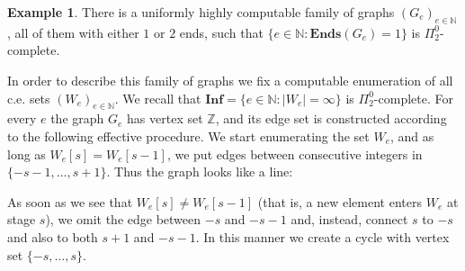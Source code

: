 \documentclass[10pt,A4]{amsart}
\theoremstyle{definition}
\newtheorem{ex}[thm]{Example}
\theoremstyle{definition}
\newcommand{\N}{\mathbb{N}}
\newcommand{\Z}{\mathbb{Z}}
\newcommand{\Ends}[1]{\mathbf{Ends}({#1})}
\begin{document}
\begin{ex}\label{grafo-con-ciclos}
There is a uniformly highly computable family of graphs $(G_e)_{e\in\N}$, all of them with either $1$ or $2$ ends, such that $\{e\in\N : \Ends{G_e}=1\}$ is $\Pi_2^0$-complete. 

In order to describe this family of graphs we fix a computable enumeration of all c.e. sets $(W_e)_{e \in \N}$. We recall that  $\textbf{Inf}=\{e\in\N:|W_e|=\infty\}$ is $\Pi_2^0$-complete. For every $e$ the graph $G_e$ has vertex set $\Z$, and its edge set is constructed according to the following effective procedure. We start enumerating the set $W_e$, and as long as $W_{e}[s] = W_{e}[s-1]$, we put edges between consecutive integers in $\{-s-1,\dots,s+1\}$. Thus the graph looks like a line: \begin{tcolorbox}
        \begin{center}
        \end{center}
    \end{tcolorbox}
    As soon as we see that $W_{e}[s] \ne W_{e}[s-1]$ (that is, a new element enters $W_e$ at stage $s$), we omit the edge between $-s$ and $-s-1$ and, instead, connect $s$ to $-s$ and also to both $s+1$ and $-s-1$. In this manner we create a cycle with vertex set $\{-s,\dots,s\}$.


\end{ex}
\end{document}
